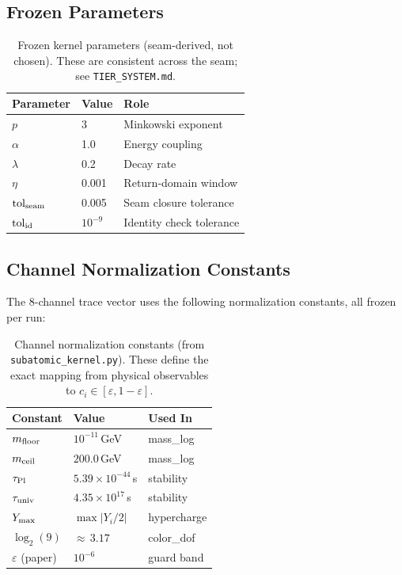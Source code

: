 \documentclass[
  aps,
  prd,
  twocolumn,
  superscriptaddress,
  nofootinbib,
  floatfix
]{revtex4-2}
\newcommand{\eps}{\varepsilon}
\begin{document}
\subsection{Frozen Parameters}

\begin{table}[H]
\caption{Frozen kernel parameters (seam-derived, not chosen).
These are consistent across the seam; see \texttt{TIER\_SYSTEM.md}.}
\label{tab:frozen}
\centering\small
\begin{tabular}{@{}lll@{}}
\toprule
\textbf{Parameter} & \textbf{Value} & \textbf{Role} \\
\midrule
$p$                & 3      & Minkowski exponent \\
$\alpha$           & 1.0    & Energy coupling \\
$\lambda$          & 0.2    & Decay rate \\
$\eta$             & 0.001  & Return-domain window \\
$\mathrm{tol}_{\rm seam}$ & 0.005  & Seam closure tolerance \\
$\mathrm{tol}_{\rm id}$   & $10^{-9}$ & Identity check tolerance \\
\bottomrule
\end{tabular}
\end{table}

\subsection{Channel Normalization Constants}

The 8-channel trace vector uses the following normalization
constants, all frozen per run:

\begin{table}[H]
\caption{Channel normalization constants (from
\texttt{subatomic\_kernel.py}).  These define the exact mapping
from physical observables to $c_i \in [\eps, 1{-}\eps]$.}
\label{tab:normalization}
\centering\footnotesize
\begin{tabular}{@{}lll@{}}
\toprule
\textbf{Constant} & \textbf{Value} & \textbf{Used In} \\
\midrule
$m_{\rm floor}$   & $10^{-11}$\,GeV  & mass\_log \\
$m_{\rm ceil}$    & $200.0$\,GeV     & mass\_log \\
$\tau_{\rm Pl}$   & $5.39{\times}10^{-44}$\,s & stability \\
$\tau_{\rm univ}$ & $4.35{\times}10^{17}$\,s & stability \\
$Y_{\rm max}$     & $\max|Y_i/2|$   & hypercharge \\
$\log_2(9)$       & ${\approx}\,3.17$& color\_dof \\
\midrule
$\eps$ (paper)    & $10^{-6}$        & guard band \\
\bottomrule
\end{tabular}
\end{table}
\end{document}
